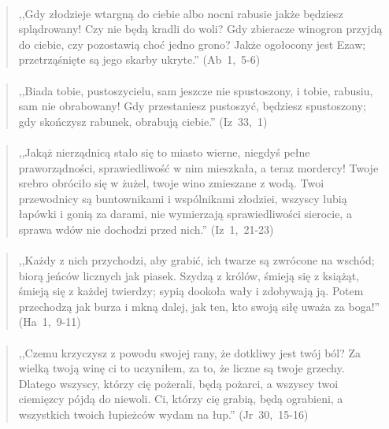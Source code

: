 \documentclass[10pt,a4paper,oneside]{article}
\begin{document}
\paragraph{}
\begin{quote}
,,Gdy złodzieje wtargną do ciebie albo nocni rabusie jakże będziesz splądrowany! Czy nie będą kradli do woli? Gdy zbieracze winogron przyjdą do ciebie, czy pozostawią choć jedno grono? Jakże ogołocony jest Ezaw; przetrząśnięte są jego skarby ukryte.'' \mbox{(Ab 1, 5-6)}
\end{quote}
\paragraph{}
\begin{quote}
,,Biada tobie, pustoszycielu, sam jeszcze nie spustoszony, i tobie, rabusiu, sam nie obrabowany! Gdy przestaniesz pustoszyć, będziesz spustoszony; gdy skończysz rabunek, obrabują ciebie.'' \mbox{(Iz 33, 1)}
\end{quote}
\paragraph{}
\begin{quote}
,,Jakąż nierządnicą stało się to miasto wierne, niegdyś pełne praworządności, sprawiedliwość w nim mieszkała, a teraz mordercy! Twoje srebro obróciło się w żużel, twoje wino zmieszane z wodą. Twoi przewodnicy są buntownikami i wspólnikami złodziei, wszyscy lubią łapówki i gonią za darami, nie wymierzają sprawiedliwości sierocie, a sprawa wdów nie dochodzi przed nich.'' \mbox{(Iz 1, 21-23)}
\end{quote}
\paragraph{}
\begin{quote}
,,Każdy z nich przychodzi, aby grabić, ich twarze są zwrócone na wschód; biorą jeńców licznych jak piasek. Szydzą z królów, śmieją się z książąt, śmieją się z każdej twierdzy; sypią dookoła wały i zdobywają ją. Potem przechodzą jak burza i mkną dalej, jak ten, kto swoją siłę uważa za boga!'' \mbox{(Ha 1, 9-11)}
\end{quote}
\paragraph{}
\begin{quote}
,,Czemu krzyczysz z powodu swojej rany, że dotkliwy jest twój ból? Za wielką twoją winę ci to uczyniłem, za to, że liczne są twoje grzechy. Dlatego wszyscy, którzy cię pożerali, będą pożarci, a wszyscy twoi ciemięzcy pójdą do niewoli. Ci, którzy cię grabią, będą ograbieni, a wszystkich twoich łupieżców wydam na łup.'' \mbox{(Jr 30, 15-16)}
\end{quote}
\end{document}
